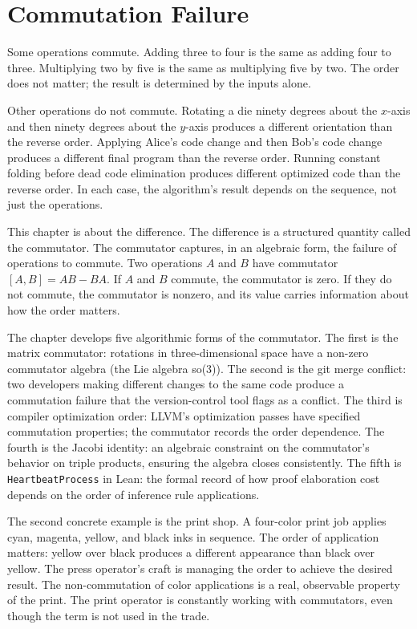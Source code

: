 \chapter{Commutation Failure}
\label{chap:commutation-failure}


\begin{chapteressay}

Some operations commute. Adding three to four is the same as adding
four to three. Multiplying two by five is the same as multiplying
five by two. The order does not matter; the result is determined by
the inputs alone.

Other operations do not commute. Rotating a die ninety degrees about
the $x$-axis and then ninety degrees about the $y$-axis produces a
different orientation than the reverse order. Applying Alice's code
change and then Bob's code change produces a different final program
than the reverse order. Running constant folding before dead code
elimination produces different optimized code than the reverse
order. In each case, the algorithm's result depends on the sequence,
not just the operations.

This chapter is about the difference. The difference is a structured
quantity called the commutator. The commutator captures, in an
algebraic form, the failure of operations to commute. Two
operations $A$ and $B$ have commutator $[A, B] = AB - BA$. If $A$
and $B$ commute, the commutator is zero. If they do not commute, the
commutator is nonzero, and its value carries information about how
the order matters.

The chapter develops five algorithmic forms of the commutator. The
first is the matrix commutator: rotations in three-dimensional space
have a non-zero commutator algebra (the Lie algebra so(3)). The
second is the git merge conflict: two developers making different
changes to the same code produce a commutation failure that the
version-control tool flags as a conflict. The third is compiler
optimization order: LLVM's optimization passes have specified
commutation properties; the commutator records the order dependence.
The fourth is the Jacobi identity: an algebraic constraint on the
commutator's behavior on triple products, ensuring the algebra
closes consistently. The fifth is \texttt{HeartbeatProcess} in
Lean: the formal record of how proof elaboration cost depends on
the order of inference rule applications.

The second concrete example is the print shop. A four-color print
job applies cyan, magenta, yellow, and black inks in sequence. The
order of application matters: yellow over black produces a
different appearance than black over yellow. The press operator's
craft is managing the order to achieve the desired result. The
non-commutation of color applications is a real, observable
property of the print. The print operator is constantly working
with commutators, even though the term is not used in the trade.


\end{chapteressay}
